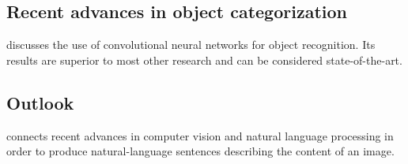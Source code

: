 \documentclass[twoside,a4paper]{article}
\begin{document}
\subsection{Recent advances in object categorization}
\label{sec:subsec_advances}
\cite{Krizhevsky_imagenet} discusses the use of convolutional neural networks for object recognition. Its results are superior to most other research and can be considered state-of-the-art.

\subsection{Outlook}
\label{sec:subsec_outlook}
\cite{Vinyals2014} connects recent advances in computer vision and natural language processing in order to produce natural-language sentences describing the content of an image.

\newpage
\nocite{*}

\end{document}
